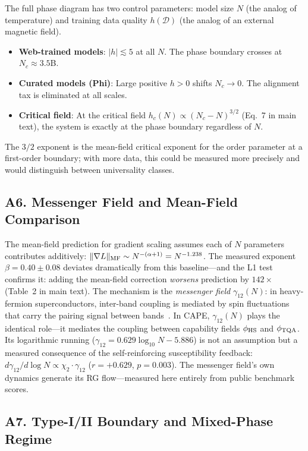 \documentclass[11pt]{article}
\begin{document}
The full phase diagram has two control parameters: model size $N$ (the analog of temperature) and training data quality $h(\mathcal{D})$ (the analog of an external magnetic field).
\begin{itemize}
  \item \textbf{Web-trained models}: $|h| \lesssim 5$ at all $N$. The phase boundary crosses at $N_c \approx 3.5$B.
  \item \textbf{Curated models (Phi)}: Large positive $h > 0$ shifts $N_c \to 0$. The alignment tax is eliminated at all scales.
  \item \textbf{Critical field}: At the critical field $h_c(N) \propto (N_c-N)^{3/2}$ (Eq.~7 in main text), the system is exactly at the phase boundary regardless of $N$.
\end{itemize}
The $3/2$ exponent is the mean-field critical exponent for the order parameter at a first-order boundary; with more data, this could be measured more precisely and would distinguish between universality classes.

\subsection*{A6. Messenger Field and Mean-Field Comparison}

The mean-field prediction for gradient scaling assumes each of $N$ parameters contributes additively: $\|\nabla L\|_{\rm MF} \sim N^{-(\alpha+1)} = N^{-1.238}$.
The measured exponent $\beta=0.40\pm0.08$ deviates dramatically from this baseline---and the L1 test confirms it: adding the mean-field correction \emph{worsens} prediction by $142\times$ (Table~2 in main text).
The mechanism is the \emph{messenger field} $\gamma_{12}(N)$: in heavy-fermion superconductors, inter-band coupling is mediated by spin fluctuations that carry the pairing signal between bands~\cite{amin2020}.
In CAPE, $\gamma_{12}(N)$ plays the identical role---it mediates the coupling between capability fields $\phi_{\rm HS}$ and $\phi_{\rm TQA}$.
Its logarithmic running ($\gamma_{12} = 0.629\log_{10}N - 5.886$) is not an assumption but a measured consequence of the self-reinforcing susceptibility feedback: $d\gamma_{12}/d\log N \propto \chi_2 \cdot \gamma_{12}$ ($r=+0.629$, $p=0.003$).
The messenger field's own dynamics generate its RG flow---measured here entirely from public benchmark scores.

\subsection*{A7. Type-I/II Boundary and Mixed-Phase Regime}
\end{document}
